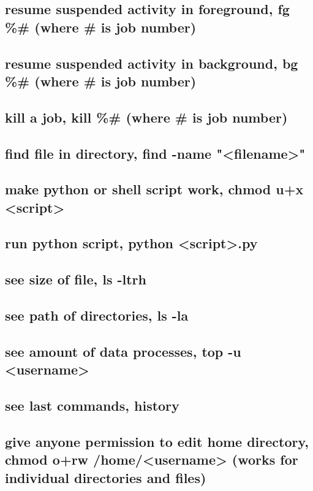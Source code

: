 \documentclass[11pt]{article}
\begin{document}
\subsection{resume suspended activity in foreground, fg \%\# (where \# is job number)}
\label{sec:orgbb3011c}
\subsection{resume suspended activity in background, bg \%\# (where \# is job number)}
\label{sec:org86b0ebf}
\subsection{kill a job, kill \%\# (where \# is job number)}
\label{sec:org7a7b098}
\subsection{find file in directory, find -name "<filename>"}
\label{sec:org753abe1}
\subsection{make python or shell script work, chmod u+x <script>}
\label{sec:org1379a25}
\subsection{run python script, python <script>.py}
\label{sec:org1c540fc}
\subsection{see size of file, ls -ltrh}
\label{sec:org839dcf1}
\subsection{see path of directories, ls -la}
\label{sec:org6e261f9}
\subsection{see amount of data processes, top -u <username>}
\label{sec:org4578d49}
\subsection{see last commands, history}
\label{sec:orge5c9582}
\subsection{give anyone permission to edit home directory, chmod o+rw /home/<username> (works for individual directories and files)}
\label{sec:org66d3865}
\end{document}
